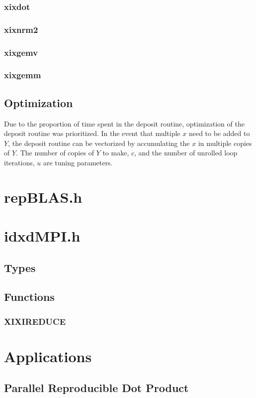 \documentclass[12pt]{article}
\theoremstyle{plain}
\begin{document}
    \subsubsection{xixdot}
    \subsubsection{xixnrm2}
    \subsubsection{xixgemv}
    \subsubsection{xixgemm}
  \subsection{Optimization}
    Due to the proportion of time spent in the deposit routine, optimization of the deposit routine was prioritized. In the event that multiple $x$ need to be added to $Y$, the deposit routine can be vectorized by accumulating the $x$ in multiple copies of $Y$. The number of copies of $Y$ to make, $c$, and the number of unrolled loop iterations, $u$ are tuning parameters.
\section{repBLAS.h}
\section{idxdMPI.h}
  \subsection{Types}
  \subsection{Functions}
    \subsubsection{XIXIREDUCE}
\section{Applications}
  \subsection{Parallel Reproducible Dot Product}
\end{document}
